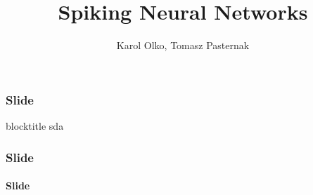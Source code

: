 \documentclass{beamer}
\author {Karol Olko, Tomasz Pasternak}
\title {Spiking Neural Networks}
\begin{document}
\frame{\titlepage}

  \begin{frame}
    \frametitle{Slide}
    \begin{block}{blocktitle}
sda
\end{block}
  \end{frame}
  \begin{frame}
    \frametitle{Slide}
    \framesubtitle{Slide}

  \end{frame}
\end{document}
